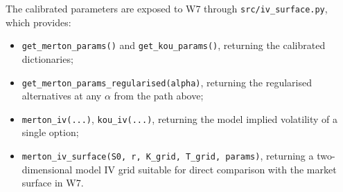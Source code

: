 \documentclass[12pt]{article}
\begin{document}
The calibrated parameters are exposed to W7 through
\texttt{src/iv\_surface.py}, which provides:
\begin{itemize}[leftmargin=*]
   \item \texttt{get\_merton\_params()} and \texttt{get\_kou\_params()},
         returning the calibrated dictionaries;
   \item \texttt{get\_merton\_params\_regularised(alpha)}, returning the
         regularised alternatives at any $\alpha$ from the path above;
   \item \texttt{merton\_iv(...)}, \texttt{kou\_iv(...)}, returning the
         model implied volatility of a single option;
   \item \texttt{merton\_iv\_surface(S0, r, K\_grid, T\_grid, params)},
         returning a two-dimensional model IV grid suitable for direct
         comparison with the market surface in W7.
\end{itemize}
\end{document}
